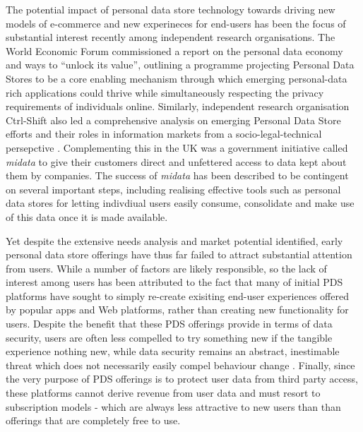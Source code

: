 \documentclass[runningheads,a4paper]{llncs}
\begin{document}
The potential impact of personal data store technology towards driving new models of e-commerce and new experineces for end-users has been the focus of substantial interest recently among independent research organisations. The World Economic Forum commissioned a report on the personal data economy and ways to ``unlock its value'', outlining a programme projecting Personal Data Stores to be a core enabling mechanism through which emerging personal-data rich applications could thrive while simultaneously respecting the privacy requirements of individuals online\cite{WEF-report}.  Similarly, independent research organisation Ctrl-Shift also led a comprehensive analysis on emerging Personal Data Store efforts and their roles in information markets from a socio-legal-technical persepctive \cite{ctrlshift}.  Complementing this in the UK was a government initiative called \emph{midata} \cite{midata} to give their customers direct and unfettered access to data kept about them by companies.  The success of \emph{midata} has been described to be contingent on several important steps, including realising effective tools such as personal data stores for letting indivdiual users easily consume, consolidate and make use of this data once it is made available.
  
Yet despite the extensive needs analysis and market potential identified, early personal data store offerings have thus far failed to attract substantial attention from users.  While a number of factors are likely responsible, so the lack of interest among users has been attributed to the fact that many of initial PDS platforms have sought to simply re-create exisiting end-user experiences offered by popular apps and Web platforms, rather than creating new functionality for users.  Despite the benefit that these PDS offerings provide in terms of data security, users are often less compelled to try something new if the tangible experience nothing new, while data security remains an abstract, inestimable threat which does not necessarily easily compel behaviour change \cite{abstract-threat}.  Finally, since the very purpose of PDS offerings is to protect user data from third party access, these platforms cannot derive revenue from user data and must resort to subscription models - which are always less attractive to new users than than offerings that are completely free to use. 

\end{document}
